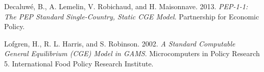 
\begin{list}{}{\setlength{\leftmargin}{2em}\setlength{\itemindent}{-2em}%
  \setlength{\itemsep}{2pt}\setlength{\parsep}{0pt}}
\item Decaluw\'e, B., A. Lemelin, V. Robichaud, and H. Maisonnave. 2013.
\textit{PEP-1-1: The PEP Standard Single-Country, Static CGE Model}.
Partnership for Economic Policy.
\item Lofgren, H., R. L. Harris, and S. Robinson. 2002. \textit{A Standard
Computable General Equilibrium (CGE) Model in GAMS}. Microcomputers in Policy
Research 5. International Food Policy Research Institute.
\end{list}


\begin{alsosee}
\end{alsosee}
